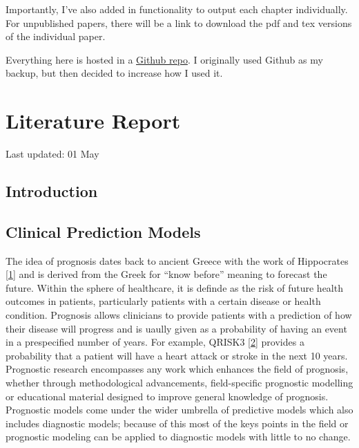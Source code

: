\documentclass[12pt,PhD,twoside,openright]{muthesis}
\begin{document}
Importantly, I've also added in functionality to output each chapter individually. For unpublished papers, there will be a link to download the pdf and tex versions of the individual paper.

Everything here is hosted in a \href{https://https://github.com/MyKo101/Thesis}{Github repo}. I originally used Github as my backup, but then decided to increase how I used it.

\hypertarget{chap-lit-report}{%
\chapter{Literature Report}\label{chap-lit-report}}


Last updated: 01 May

\hypertarget{introduction-1}{%
\section{Introduction}\label{introduction-1}}

\hypertarget{clinical-prediction-models}{%
\section{Clinical Prediction Models}\label{clinical-prediction-models}}

The idea of prognosis dates back to ancient Greece with the work of Hippocrates {[}\protect\hyperlink{ref-hippocrates_genuine_1886}{1}{]} and is derived from the Greek for ``know before'' meaning to forecast the future. Within the sphere of healthcare, it is definde as the risk of future health outcomes in patients, particularly patients with a certain disease or health condition. Prognosis allows clinicians to provide patients with a prediction of how their disease will progress and is uaully given as a probability of having an event in a prespecified number of years. For example, QRISK3 {[}\protect\hyperlink{ref-hippisley-cox_development_2017}{2}{]} provides a probability that a patient will have a heart attack or stroke in the next 10 years. Prognostic research encompasses any work which enhances the field of prognosis, whether through methodological advancements, field-specific prognostic modelling or educational material designed to improve general knowledge of prognosis. Prognostic models come under the wider umbrella of predictive models which also includes diagnostic models; because of this most of the keys points in the field or prognostic modeling can be applied to diagnostic models with little to no change.
\end{document}
